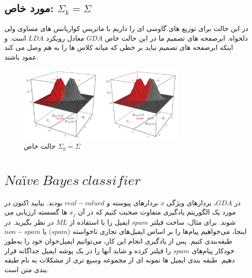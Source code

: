 \documentclass[12pt]{article}
\begin{document}
\subsection*{مورد خاص: $\Sigma_{k}=\Sigma$ }

در این حالت برای توزیع های گاوسی ای را داریم با ماتریس کواریانس های مساوی ولی دلخواه. ابرصفحه های تصمیم ما در این حالت خاص $GDA$ معادل رویکرد $LDA$ است.
و اینکه ابرصفحه های تصمیم نباید بر خطی که میانه کلاس ها را به هم وصل می کند عمود باشند.
\begin{figure}[h]
  \centering
  \includegraphics[width=0.75\textwidth]{figs/5.png}
  \caption{حالت خاص $\Sigma_{k}=\Sigma$}
  \label{5}
\end{figure}


\section*{$Naïve\:Bayes\:classifier$}
در $GDA$، بردارهای ویژگی $x$ بردارهای پیوسته و $real-valued$ بودند. بیایید اکنون در مورد یک الگوریتم یادگیری متفاوت صحبت کنیم که در آن $x_j$ ها گسسته ارزیابی می شوند.
برای مثال، ساخت فیلتر $spam$ ایمیل را با استفاده از $ML$ در نظر بگیرید. در اینجا، می‌خواهیم پیام‌ها را بر اساس ایمیل‌های تجاری ناخواسته ($spam$) یا $non-spam$ طبقه‌بندی کنیم. پس از یادگیری انجام این کار، می‌توانیم ایمیل‌خوان خود را به‌طور خودکار پیام‌های $spam$ را فیلتر کرده و شاید آنها را در یک پوشه ایمیل جداگانه قرار دهیم. طبقه بندی ایمیل ها نمونه ای از مجموعه وسیع تری از مشکلات به نام طبقه بندی متن است.
\end{document}
